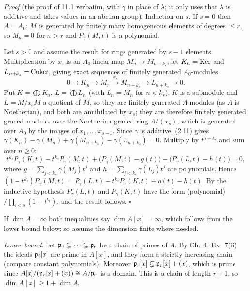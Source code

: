 \documentclass[11pt]{article}
\begin{document}
\emph{Proof} (the proof of 11.1 verbatim, with $\gamma$ in place of $\lambda$; it only uses that $\lambda$ is additive and takes values in an abelian group). Induction on $s$. If $s=0$ then $A=A_0$; $M$ is generated by finitely many homogeneous elements of degrees $\le r$, so $M_n=0$ for $n>r$ and $P_\gamma(M,t)$ is a polynomial.

Let $s>0$ and assume the result for rings generated by $s-1$ elements. Multiplication by $x_s$ is an $A_0$-linear map $M_n\to M_{n+k_s}$; let $K_n=\operatorname{Ker}$ and $L_{n+k_s}=\operatorname{Coker}$, giving exact sequences of finitely generated $A_0$-modules
\[
0\to K_n\to M_n\xrightarrow{x_s}M_{n+k_s}\to L_{n+k_s}\to0 .
\]
Put $K=\bigoplus K_n$, $L=\bigoplus L_n$ (with $L_n=M_n$ for $n<k_s$). $K$ is a submodule and $L=M/x_sM$ a quotient of $M$, so they are finitely generated $A$-modules (as $A$ is Noetherian), and both are annihilated by $x_s$; they are therefore finitely generated graded modules over the Noetherian graded ring $A/(x_s)$, which is generated over $A_0$ by the images of $x_1,\dots,x_{s-1}$. Since $\gamma$ is additive, (2.11) gives $\gamma(K_n)-\gamma(M_n)+\gamma(M_{n+k_s})-\gamma(L_{n+k_s})=0$. Multiply by $t^{n+k_s}$ and sum over $n\ge0$:
\[
t^{k_s}P_\gamma(K,t)-t^{k_s}P_\gamma(M,t)+\bigl(P_\gamma(M,t)-g(t)\bigr)-\bigl(P_\gamma(L,t)-h(t)\bigr)=0,
\]
where $g=\sum_{j<k_s}\gamma(M_j)t^j$ and $h=\sum_{j<k_s}\gamma(L_j)t^j$ are polynomials. Hence $(1-t^{k_s})P_\gamma(M,t)=P_\gamma(L,t)-t^{k_s}P_\gamma(K,t)+g(t)-h(t)$. By the inductive hypothesis $P_\gamma(L,t)$ and $P_\gamma(K,t)$ have the form (polynomial)$/\prod_{i<s}(1-t^{k_i})$, and the result follows. \hfill$\square$

\pf
If $\dim A=\infty$ both inequalities say $\dim A[x]=\infty$, which follows from the lower bound below; so assume the dimension finite where needed.

\emph{Lower bound.} Let $\mathfrak p_0\subsetneq\cdots\subsetneq\mathfrak p_r$ be a chain of primes of $A$. By Ch.~4, Ex.~7(ii) the ideals $\mathfrak p_i[x]$ are prime in $A[x]$, and they form a strictly increasing chain (compare constant polynomials). Moreover $\mathfrak p_r[x]\subsetneq\mathfrak p_r[x]+(x)$, which is prime since $A[x]/(\mathfrak p_r[x]+(x))\cong A/\mathfrak p_r$ is a domain. This is a chain of length $r+1$, so $\dim A[x]\ge1+\dim A$.
\end{document}
